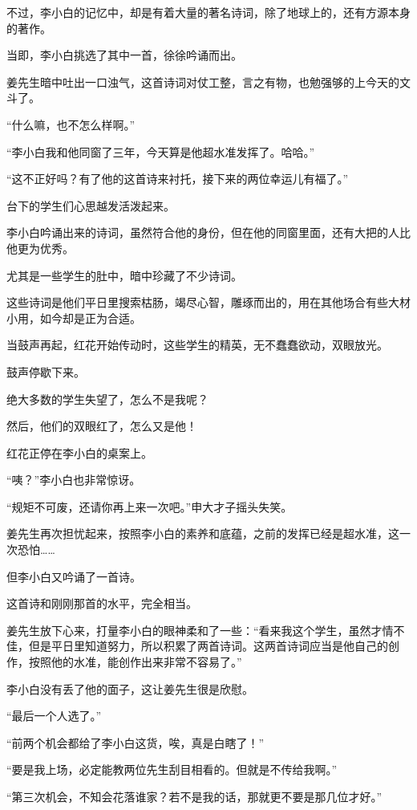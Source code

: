 \begin{this_body}
不过，李小白的记忆中，却是有着大量的著名诗词，除了地球上的，还有方源本身的著作。

当即，李小白挑选了其中一首，徐徐吟诵而出。

姜先生暗中吐出一口浊气，这首诗词对仗工整，言之有物，也勉强够的上今天的文斗了。

“什么嘛，也不怎么样啊。”

“李小白我和他同窗了三年，今天算是他超水准发挥了。哈哈。”

“这不正好吗？有了他的这首诗来衬托，接下来的两位幸运儿有福了。”

台下的学生们心思越发活泼起来。

李小白吟诵出来的诗词，虽然符合他的身份，但在他的同窗里面，还有大把的人比他更为优秀。

尤其是一些学生的肚中，暗中珍藏了不少诗词。

这些诗词是他们平日里搜索枯肠，竭尽心智，雕琢而出的，用在其他场合有些大材小用，如今却是正为合适。

当鼓声再起，红花开始传动时，这些学生的精英，无不蠢蠢欲动，双眼放光。

鼓声停歇下来。

绝大多数的学生失望了，怎么不是我呢？

然后，他们的双眼红了，怎么又是他！

红花正停在李小白的桌案上。

“咦？”李小白也非常惊讶。

“规矩不可废，还请你再上来一次吧。”申大才子摇头失笑。

姜先生再次担忧起来，按照李小白的素养和底蕴，之前的发挥已经是超水准，这一次恐怕……

但李小白又吟诵了一首诗。

这首诗和刚刚那首的水平，完全相当。

姜先生放下心来，打量李小白的眼神柔和了一些：“看来我这个学生，虽然才情不佳，但是平日里知道努力，所以积累了两首诗词。这两首诗词应当是他自己的创作，按照他的水准，能创作出来非常不容易了。”

李小白没有丢了他的面子，这让姜先生很是欣慰。

“最后一个人选了。”

“前两个机会都给了李小白这货，唉，真是白瞎了！”

“要是我上场，必定能教两位先生刮目相看的。但就是不传给我啊。”

“第三次机会，不知会花落谁家？若不是我的话，那就更不要是那几位才好。”


\end{this_body}
